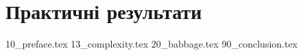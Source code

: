 \chapter{Практичні результати}

{10_preface.tex}
{13_complexity.tex}
{20_babbage.tex}
{90_conclusion.tex}
